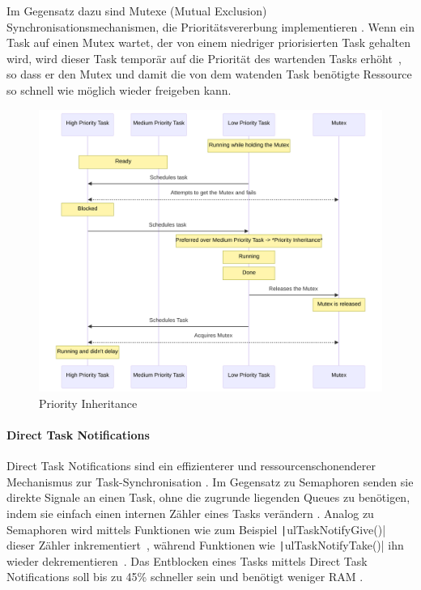 Im Gegensatz dazu sind Mutexe (Mutual Exclusion) Synchronisationsmechanismen,
die Prioritätsvererbung implementieren \cite{freertos_mutexes}. Wenn ein Task
auf einen Mutex wartet, der von einem niedriger priorisierten Task gehalten
wird, wird dieser Task temporär auf die Priorität des wartenden Tasks
erhöht~\cite{FreertosForumSemphMtx}, so dass er den Mutex und damit die von dem
watenden Task benötigte Ressource so schnell wie möglich wieder freigeben kann.

\begin{figure}[htb]
    \centering
    \includegraphics[width=1\textwidth]{assets/prio_inheritance}
    \caption{Priority Inheritance}
\end{figure}

\paragraph{Direct Task Notifications} \label{sec:direct_task_notification}

Direct Task Notifications sind ein effizienterer und ressourcenschonenderer
Mechanismus zur Task-Synchronisation \cite{freertos_task_notifications_desc}. Im
Gegensatz zu Semaphoren senden sie direkte Signale an einen Task, ohne die
zugrunde liegenden Queues zu benötigen, indem sie einfach einen internen Zähler
eines Tasks verändern \cite{freertos_tasks_c_213}. Analog zu Semaphoren wird
mittels Funktionen wie zum Beispiel \texttt|ulTaskNotifyGive()| dieser
Zähler inkrementiert~\cite{freertos_tasks_c_4296}, während Funktionen wie
\texttt|ulTaskNotifyTake()| ihn wieder
dekrementieren~\cite{freertos_tasks_c_3926}. Das Entblocken eines Tasks mittels
Direct Task Notifications soll bis zu 45\% schneller sein und benötigt weniger
RAM \cite{freertos_task_notifications_usage}.

